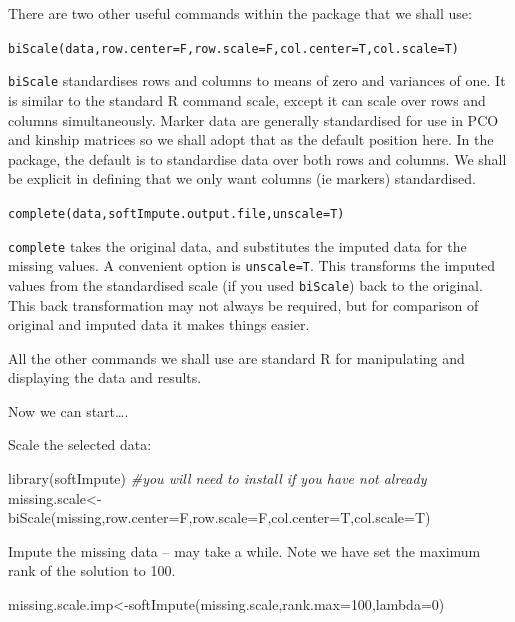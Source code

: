 \documentclass[
]{book}
\newenvironment{Shaded}{\begin{snugshade}}{\end{snugshade}}
\newcommand{\AttributeTok}[1]{\textcolor[rgb]{0.77,0.63,0.00}{#1}}
\newcommand{\CommentTok}[1]{\textcolor[rgb]{0.56,0.35,0.01}{\textit{#1}}}
\newcommand{\DecValTok}[1]{\textcolor[rgb]{0.00,0.00,0.81}{#1}}
\newcommand{\FunctionTok}[1]{\textcolor[rgb]{0.00,0.00,0.00}{#1}}
\newcommand{\NormalTok}[1]{#1}
\newcommand{\OtherTok}[1]{\textcolor[rgb]{0.56,0.35,0.01}{#1}}
\begin{document}
There are two other useful commands within the package that we shall use:

\texttt{biScale(data,row.center=F,row.scale=F,col.center=T,col.scale=T)}

\texttt{biScale} standardises rows and columns to means of zero and variances of one. It is similar to the standard R command scale, except it can scale over rows and columns simultaneously. Marker data are generally standardised for use in PCO and kinship matrices so we shall adopt that as the default position here. In the package, the default is to standardise data over both rows and columns. We shall be explicit in defining that we only want columns (ie markers) standardised.

\texttt{complete(data,softImpute.output.file,unscale=T)}

\texttt{complete} takes the original data, and substitutes the imputed data for the missing values. A convenient option is \texttt{unscale=T}. This transforms the imputed values from the standardised scale (if you used \texttt{biScale}) back to the original. This back transformation may not always be required, but for comparison of original and imputed data it makes things easier.

All the other commands we shall use are standard R for manipulating and displaying the data and results.

Now we can start\ldots.

Scale the selected data:

\begin{Shaded}
\begin{Highlighting}[]
\FunctionTok{library}\NormalTok{(softImpute) }\CommentTok{\#you will need to install if you have not already}
\NormalTok{missing.scale}\OtherTok{\textless{}{-}}\FunctionTok{biScale}\NormalTok{(missing,}\AttributeTok{row.center=}\NormalTok{F,}\AttributeTok{row.scale=}\NormalTok{F,}\AttributeTok{col.center=}\NormalTok{T,}\AttributeTok{col.scale=}\NormalTok{T)}
\end{Highlighting}
\end{Shaded}

Impute the missing data -- may take a while. Note we have set the maximum rank of the solution to 100.

\begin{Shaded}
\begin{Highlighting}[]
\NormalTok{missing.scale.imp}\OtherTok{\textless{}{-}}\FunctionTok{softImpute}\NormalTok{(missing.scale,}\AttributeTok{rank.max=}\DecValTok{100}\NormalTok{,}\AttributeTok{lambda=}\DecValTok{0}\NormalTok{)  }
\end{Highlighting}
\end{Shaded}
\end{document}
